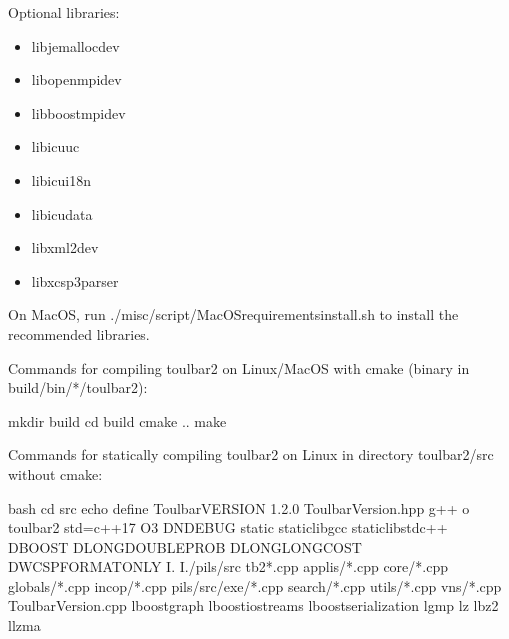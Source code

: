 \documentclass[letterpaper,10pt,openany,oneside,english]{sphinxmanual}
\begin{document}
\sphinxAtStartPar
Optional libraries:
\begin{itemize}
\item {} 
\sphinxAtStartPar
libjemalloc\sphinxhyphen{}dev

\item {} 
\sphinxAtStartPar
libopenmpi\sphinxhyphen{}dev

\item {} 
\sphinxAtStartPar
libboost\sphinxhyphen{}mpi\sphinxhyphen{}dev

\item {} 
\sphinxAtStartPar
libicuuc

\item {} 
\sphinxAtStartPar
libicui18n

\item {} 
\sphinxAtStartPar
libicudata

\item {} 
\sphinxAtStartPar
libxml2\sphinxhyphen{}dev

\item {} 
\sphinxAtStartPar
libxcsp3parser

\end{itemize}

\sphinxAtStartPar
On MacOS, run ./misc/script/MacOS\sphinxhyphen{}requirements\sphinxhyphen{}install.sh to install the recommended libraries.

\sphinxAtStartPar
Commands for compiling toulbar2 on Linux/MacOS with cmake (binary in build/bin/*/toulbar2):

\begin{sphinxVerbatim}[commandchars=\\\{\}]
mkdir build
cd build
cmake ..
make
\end{sphinxVerbatim}

\sphinxAtStartPar
Commands for statically compiling toulbar2 on Linux in directory toulbar2/src without cmake:

\begin{sphinxVerbatim}[commandchars=\\\{\}]
bash
cd src
echo \PYGZsq{}\PYGZsh{}define Toulbar\PYGZus{}VERSION \PYGZdq{}1.2.0\PYGZdq{}\PYGZsq{} \PYGZgt{} ToulbarVersion.hpp
g++ \PYGZhy{}o toulbar2 \PYGZhy{}std=c++17 \PYGZhy{}O3 \PYGZhy{}DNDEBUG \PYGZhy{}static \PYGZhy{}static\PYGZhy{}libgcc \PYGZhy{}static\PYGZhy{}libstdc++ \PYGZhy{}DBOOST \PYGZhy{}DLONGDOUBLE\PYGZus{}PROB \PYGZhy{}DLONGLONG\PYGZus{}COST \PYGZhy{}DWCSPFORMATONLY \PYGZbs{}
 \PYGZhy{}I. \PYGZhy{}I./pils/src tb2*.cpp applis/*.cpp core/*.cpp globals/*.cpp incop/*.cpp pils/src/exe/*.cpp search/*.cpp utils/*.cpp vns/*.cpp ToulbarVersion.cpp \PYGZbs{}
 \PYGZhy{}lboost\PYGZus{}graph \PYGZhy{}lboost\PYGZus{}iostreams \PYGZhy{}lboost\PYGZus{}serialization \PYGZhy{}lgmp \PYGZhy{}lz \PYGZhy{}lbz2 \PYGZhy{}llzma
\end{sphinxVerbatim}
\end{document}
